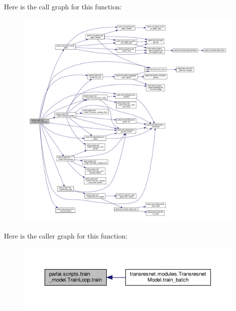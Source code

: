 Here is the call graph for this function\+:
\nopagebreak
\begin{figure}[H]
\begin{center}
\leavevmode
\includegraphics[width=350pt]{classparlai_1_1scripts_1_1train__model_1_1TrainLoop_a8c15c0d4490891fd3e61e57501474e40_cgraph}
\end{center}
\end{figure}
Here is the caller graph for this function\+:
\nopagebreak
\begin{figure}[H]
\begin{center}
\leavevmode
\includegraphics[width=350pt]{classparlai_1_1scripts_1_1train__model_1_1TrainLoop_a8c15c0d4490891fd3e61e57501474e40_icgraph}
\end{center}
\end{figure}
\mbox{\label{classparlai_1_1scripts_1_1train__model_1_1TrainLoop_a707bb03792ef7427f5ddbb66184a9756}} 
